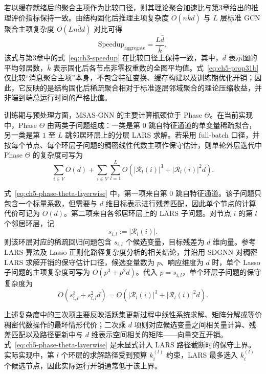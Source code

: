 若以缓存就绪后的聚合主项作为比较口径，则其理论聚合加速比与第3章给出的推理评价指标保持一致。由结构固化后推理主项复杂度 $O(n\bar{k}d)$ 与 $L$ 层标准 GCN 聚合主项复杂度 $O(Ln\bar{d}d)$ 对比可得
\begin{equation}
  \text{Speedup}_{\text{aggregate}}
  =
  \frac{L\bar{d}}{\bar{k}},
  \label{eq:ch5-prop31b}
\end{equation}
该式与第3章中的式~\eqref{eq:ch3-speedup} 在比较口径上保持一致，其中，$\bar{d}$ 表示图的平均邻居数，$\bar{k}$ 表示固化后各节点非零权重数的全图平均值。式~\eqref{eq:ch5-prop31b} 仅比较“消息聚合主项”本身，不包含特征变换、缓存构建以及训练期优化开销；因此，它反映的是结构固化后稀疏聚合相对于标准逐层邻域聚合的理论压缩收益，并非端到端总运行时间的严格比值。

训练期与预处理方面，MSAS-GNN 的主要计算瓶颈位于 Phase $\Theta$。在当前实现中，Phase $\Theta$ 由两类子问题组成：一类是第 $0$ 跳自特征通道的单变量稀疏拟合，另一类是第 $1$ 至 $L$ 跳邻居环层上的分层 LARS 求解。若采用 full-batch 口径，并按每个节点、每个环层子问题的稠密线性代数主项作保守估计，则单轮外层迭代中 Phase $\Theta$ 的复杂度可写为
\begin{equation}
  \sum_{i\in V} O(d)
  +
  \sum_{i\in V}\sum_{l=1}^{L}
  O\!\left(|\mathcal{R}_l(i)|^3 + |\mathcal{R}_l(i)|^2 d\right).
  \label{eq:ch5-phase-theta-layerwise}
\end{equation}

式~\eqref{eq:ch5-phase-theta-layerwise} 中，第一项来自第 $0$ 跳自特征通道。该子问题只包含一个标量系数，但需要与 $d$ 维目标表示进行残差匹配，因此单个节点的计算代价可记为 $O(d)$。第二项来自各邻居环层上的 LARS 子问题。对节点 $i$ 的第 $l$ 个邻居环层，记
\begin{equation}
  s_{i,l}:=|\mathcal{R}_l(i)|.
  \label{eq:ch5-sil-def}
\end{equation}
则该环层对应的稀疏回归问题包含 $s_{i,l}$ 个候选变量，目标残差为 $d$ 维向量。参考 LARS 算法及 Lasso 正则化路径复杂度分析的相关结论\cite{Efron2004LARS,Mairal2012LARSComplexity}，并沿用 SDGNN 对稠密 LARS 求解开销的保守估计口径，候选变量数为 $p$、响应维度为 $d$ 时，单个 Lasso 子问题的主项复杂度可写为 $O(p^3+p^2d)$。代入 $p=s_{i,l}$，单个环层子问题的保守复杂度为
\begin{equation}
  O\!\left(s_{i,l}^3+s_{i,l}^2d\right)
  =
  O\!\left(|\mathcal{R}_l(i)|^3+|\mathcal{R}_l(i)|^2d\right).
  \label{eq:ch5-phase-theta-subproblem}
\end{equation}

上述复杂度中的三次项主要反映活跃集更新过程中线性系统求解、矩阵分解或等价稠密代数操作的最坏情形代价；二次乘 $d$ 项则对应候选变量之间相关量计算、残差匹配以及路径更新中与 $d$ 维表示空间相关的矩阵——向量交互开销。式~\eqref{eq:ch5-phase-theta-layerwise} 是未显式计入 LARS 路径截断时的保守上界。实际实现中，第 $l$ 个环层的求解路径受到预算 $k_i^{(l)}$ 约束，LARS 最多选入 $k_i^{(l)}$ 个候选节点，因此实际运行开销通常低于该上界。

